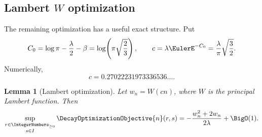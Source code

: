 \documentclass[11pt,oneside]{article}
\newtheorem{lemma}[lemma]{Lemma}
\theoremstyle{definition}
\theoremstyle{remark}
\begin{document}
\subsection{Lambert \texorpdfstring{\(W\)}{W} optimization}

The remaining optimization has a useful exact structure.  Put
\begin{equation}
 C_0=\log\pi-\frac\lambda2-\beta
 =\log\!\left(\pi\sqrt{\frac23}\right),
 \qquad
 c=\lambda\EulerE^{-C_0}
 =\frac{\lambda}{\pi}\sqrt{\frac32}.
 \label{eq:C0-c}
\end{equation}
Numerically,
\begin{equation}
 c=0.27022231973336536\ldots.
 \label{eq:c-numeric}
\end{equation}

\begin{lemma}[Lambert optimization]
\label{lem:Lambert-optimization}
Let \(w_n=W(cn)\), where \(W\) is the principal Lambert function.  Then
\begin{equation}
 \sup_{\substack{r\in\IntegerNumbers_{\ge0}\\s\in I}}
 \DecayOptimizationObjective{n}(r,s)
 =-\frac{w_n^2+2w_n}{2\lambda}+\BigO(1).
 \label{eq:Lambert-optimization-result}
\end{equation}
\end{lemma}
\end{document}
